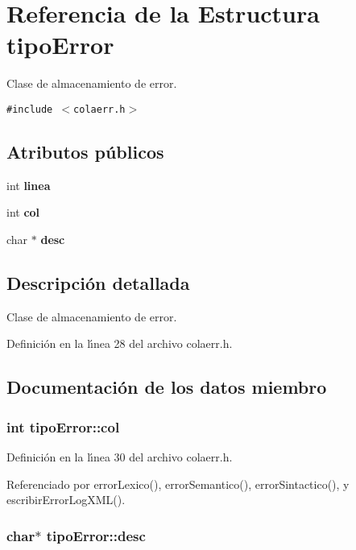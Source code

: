 \section{Referencia de la Estructura tipo\-Error}
\label{structtipoError}
Clase de almacenamiento de error.  


{\tt \#include $<$colaerr.h$>$}

\subsection*{Atributos p\'{u}blicos}
\begin{CompactItemize}
\item 
int {\bf linea}
\item 
int {\bf col}
\item 
char $\ast$ {\bf desc}
\end{CompactItemize}


\subsection{Descripci\'{o}n detallada}
Clase de almacenamiento de error. 



Definici\'{o}n en la l\'{\i}nea 28 del archivo colaerr.h.

\subsection{Documentaci\'{o}n de los datos miembro}
\subsubsection{\setlength{\rightskip}{0pt plus 5cm}int {\bf tipo\-Error::col}}\label{structtipoError_o1}




Definici\'{o}n en la l\'{\i}nea 30 del archivo colaerr.h.

Referenciado por error\-Lexico(), error\-Semantico(), error\-Sintactico(), y escribir\-Error\-Log\-XML().
\subsubsection{\setlength{\rightskip}{0pt plus 5cm}char$\ast$ {\bf tipo\-Error::desc}}\label{structtipoError_o2}




